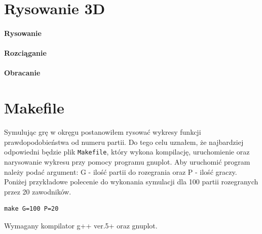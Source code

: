 
\section{Rysowanie 3D}
\label{sec::3d}
\paragraph{Rysowanie}

\paragraph{Rozciąganie}

\paragraph{Obracanie}

\section{Makefile}
\label{sec::makefile}
Symulując grę w okręgu postanowiłem rysować wykresy funkcji prawdopodobieństwa od numeru partii. Do tego celu uznałem, że najbardziej odpowiedni będzie plik \texttt{Makefile}, który wykona kompilację, uruchomienie oraz narysowanie wykresu przy pomocy programu gnuplot. Aby uruchomić program należy podać argument: G - ilość partii do rozegrania oraz P - ilość graczy. Poniżej przykładowe polecenie do wykonania symulacji dla 100 partii rozegranych przez 20 zawodników.
\begin{verbatim}
make G=100 P=20
\end{verbatim}
Wymagany kompilator g++ ver.5+ oraz gnuplot. 
